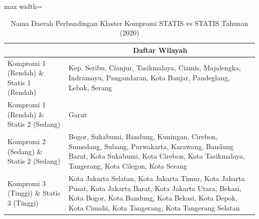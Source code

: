 \begin{table}[H]
\centering
\caption{Nama Daerah Perbandingan Klaster Kompromi STATIS vs STATIS Tahunan (2020)} \label{tab:app2comp_statis_name_2020}
\begin{adjustbox}{max width=\textwidth}
\begin{tabular}{|>{\centering\arraybackslash}p{4cm}|p{10cm}|}
\hline
\multicolumn{1}{|c|}{\textbf{Kategori}} & \multicolumn{1}{c|}{\textbf{Daftar Wilayah}} \\
\hline
Kompromi 1 (Rendah) \& Statis 1 (Rendah) & Kep. Seribu, Cianjur, Tasikmalaya, Ciamis, Majalengka, Indramayu, Pangandaran, Kota Banjar, Pandeglang, Lebak, Serang \\
\hline
Kompromi 1 (Rendah) \& Statis 2 (Sedang) & Garut \\
\hline
Kompromi 2 (Sedang) \& Statis 2 (Sedang) & Bogor, Sukabumi, Bandung, Kuningan, Cirebon, Sumedang, Subang, Purwakarta, Karawang, Bandung Barat, Kota Sukabumi, Kota Cirebon, Kota Tasikmalaya, Tangerang, Kota Cilegon, Kota Serang \\
\hline
Kompromi 3 (Tinggi) \& Statis 3 (Tinggi) & Kota Jakarta Selatan, Kota Jakarta Timur, Kota Jakarta Pusat, Kota Jakarta Barat, Kota Jakarta Utara, Bekasi, Kota Bogor, Kota Bandung, Kota Bekasi, Kota Depok, Kota Cimahi, Kota Tangerang, Kota Tangerang Selatan \\
\hline
\end{tabular}
\end{adjustbox}
\end{table}